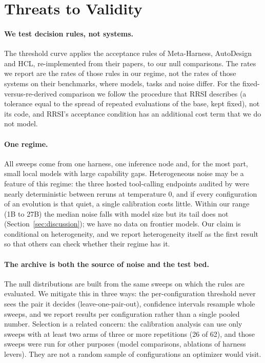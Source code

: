 
\section{Threats to Validity}\label{sec:threats}

\paragraph{We test decision rules, not systems.}
The threshold curve applies the acceptance rules of Meta-Harness, AutoDesign
and HCL, re-implemented from their papers, to our null comparisons. The rates we
report are the rates of those rules in our regime, not the rates of those
systems on their benchmarks, where models, tasks and noise differ. For the
fixed-versus-re-derived comparison we follow the procedure that RRSI describes
(a tolerance equal to the spread of repeated evaluations of the base, kept
fixed), not its code, and RRSI's acceptance condition has an additional cost
term that we do not model.

\paragraph{One regime.}
All sweeps come from one harness, one inference node and, for the most part,
small local models with large capability gaps. Heterogeneous noise may be a
feature of this regime: the three hosted tool-calling endpoints audited by \citet{chen2026noisefloor} were nearly deterministic between reruns at temperature 0, and if
every configuration of an evolution is that quiet, a single calibration costs
little. Within our range (1B to 27B) the median noise falls with model size but
its tail does not (Section~\ref{sec:discussion}); we have no data on frontier
models.
Our claim is conditional on heterogeneity, and we report heterogeneity itself
as the first result so that others can check whether their regime has it.

\paragraph{The archive is both the source of noise and the test bed.}
The null distributions are built from the same sweeps on which the rules are
evaluated. We mitigate this in three ways: the per-configuration threshold never
sees the pair it decides (leave-one-pair-out), confidence intervals resample
whole sweeps, and we report results per configuration rather than a single
pooled number. Selection is a related concern: the calibration analysis can use
only sweeps with at least two arms of three or more repetitions (26 of 62), and
those sweeps were run for other purposes (model comparisons, ablations of harness
levers). They are not a random sample of configurations an optimizer would
visit.

